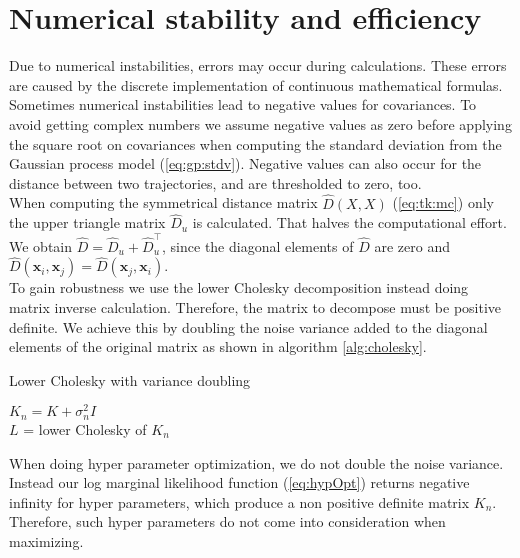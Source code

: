 \section{Numerical stability and efficiency}
Due to numerical instabilities, errors may occur during calculations. These errors are caused by the discrete implementation of continuous mathematical formulas. Sometimes numerical instabilities lead to negative values for covariances. To avoid getting complex numbers we assume negative values as zero before applying the square root on covariances when computing the standard deviation from the Gaussian process model (\ref{eq:gp:stdv}). Negative values can also occur for the distance between two trajectories, and are thresholded to zero, too.\\

When computing the symmetrical distance matrix $\hat{D}(X,X)$ (\ref{eq:tk:mc}) only the upper triangle matrix $\hat{D}_{u}$ is calculated. That halves the computational effort. We obtain $\hat{D} = \hat{D}_{u}+\hat{D}_{u}^\top$, since the diagonal elements of $\hat{D}$ are zero and $\hat{D}(\mathbf{x}_i,\mathbf{x}_j) = \hat{D}(\mathbf{x}_j,\mathbf{x}_i)$.\\

To gain robustness we use the lower Cholesky decomposition instead doing matrix inverse calculation. Therefore, the matrix to decompose must be positive definite. We achieve this by doubling the noise variance added to the diagonal elements of the original matrix as shown in algorithm \ref{alg:cholesky}.

\begin{algorithm}
    \caption{Lower Cholesky with variance doubling\label{alg:cholesky}}
    \BlankLine
    $K_n = K+\sigma_n^2 I$\\
    $L$ = lower Cholesky of $K_n$\\
\end{algorithm}

When doing hyper parameter optimization, we do not double the noise variance. Instead our log marginal likelihood function (\ref{eq:hypOpt}) returns negative infinity for hyper parameters, which produce a non positive definite matrix $K_n$. Therefore, such hyper parameters do not come into consideration when maximizing.

